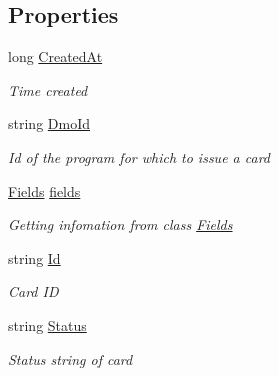 \subsection*{Properties}
\begin{DoxyCompactItemize}
\item 
long \hyperlink{class_giift_a_p_i_c_sharp_1_1_card_details_af1b2078133dcb298cd0eabe4bc63cda5}{Created\+At}
\begin{DoxyCompactList}\small\item\em Time created \end{DoxyCompactList}\item 
string \hyperlink{class_giift_a_p_i_c_sharp_1_1_card_details_ab3a7d86810927bc1492ca1f2d5838301}{Dmo\+Id}
\begin{DoxyCompactList}\small\item\em Id of the program for which to issue a card \end{DoxyCompactList}\item 
\hyperlink{class_giift_a_p_i_c_sharp_1_1_card_details_1_1_fields}{Fields} \hyperlink{class_giift_a_p_i_c_sharp_1_1_card_details_a927bac2b4ee41a077f9420e953a52143}{fields}
\begin{DoxyCompactList}\small\item\em Getting infomation from class \hyperlink{class_giift_a_p_i_c_sharp_1_1_card_details_1_1_fields}{Fields} \end{DoxyCompactList}\item 
string \hyperlink{class_giift_a_p_i_c_sharp_1_1_card_details_a2f4631b9d0ce9ec2e74df48ff8a6aba4}{Id}
\begin{DoxyCompactList}\small\item\em Card ID \end{DoxyCompactList}\item 
string \hyperlink{class_giift_a_p_i_c_sharp_1_1_card_details_a25f3d7741d50c4be347ca25972fb6ce1}{Status}
\begin{DoxyCompactList}\small\item\em Status string of card \end{DoxyCompactList}\item 

\end{DoxyCompactItemize}
